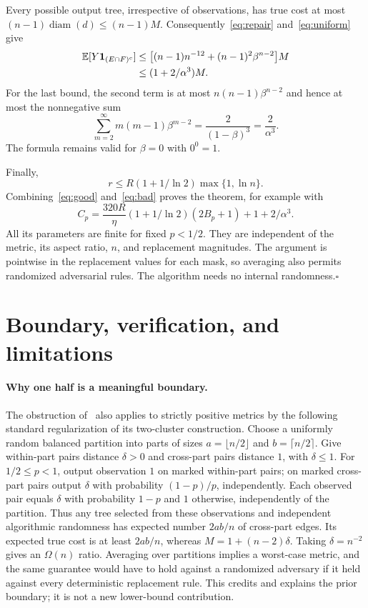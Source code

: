 \documentclass[acmlarge,screen,nonacm,11pt]{acmart}
\newcommand{\E}{\mathbb{E}}
\newcommand{\ind}{\mathbf{1}}
\begin{document}
Every possible output tree, irrespective of observations, has true cost at most $(n-1)\operatorname{diam}(d)\leq(n-1)M$. Consequently~\eqref{eq:repair} and~\eqref{eq:uniform} give
\begin{align}
 \E[Y\ind_{(E\cap F)^c}]
 &\leq\bigl[(n-1)n^{-12}+(n-1)^2\beta^{n-2}\bigr]M\notag\\
 &\leq(1+2/\alpha^3)M.\label{eq:bad}
\end{align}
For the last bound, the second term is at most $n(n-1)\beta^{n-2}$ and hence at most the nonnegative sum
\[
 \sum_{m=2}^{\infty}m(m-1)\beta^{m-2}
 =\frac{2}{(1-\beta)^3}=\frac{2}{\alpha^3}.
\]
The formula remains valid for $\beta=0$ with $0^0=1$.

Finally,
\[
 r\leq R(1+1/\ln2)\max\{1,\ln n\}.
\]
Combining~\eqref{eq:good} and~\eqref{eq:bad} proves the theorem, for example with
\[
 C_p=\frac{320R}{\eta}(1+1/\ln2)(2B_p+1)+1+2/\alpha^3.
\]
All its parameters are finite for fixed $p<1/2$. They are independent of the metric, its aspect ratio, $n$, and replacement magnitudes. The argument is pointwise in the replacement values for each mask, so averaging also permits randomized adversarial rules. The algorithm needs no internal randomness.\hfill$\square$

\section{Boundary, verification, and limitations}
\paragraph{Why one half is a meaningful boundary.}
The obstruction of~\cite[Theorem~1.5]{AGJLV26} also applies to strictly positive metrics by the following standard regularization of its two-cluster construction. Choose a uniformly random balanced partition into parts of sizes $a=\lfloor n/2\rfloor$ and $b=\lceil n/2\rceil$. Give within-part pairs distance $\delta>0$ and cross-part pairs distance $1$, with $\delta\leq1$. For $1/2\leq p<1$, output observation $1$ on marked within-part pairs; on marked cross-part pairs output $\delta$ with probability $(1-p)/p$, independently. Each observed pair equals $\delta$ with probability $1-p$ and $1$ otherwise, independently of the partition. Thus any tree selected from these observations and independent algorithmic randomness has expected number $2ab/n$ of cross-part edges. Its expected true cost is at least $2ab/n$, whereas $M=1+(n-2)\delta$. Taking $\delta=n^{-2}$ gives an $\Omega(n)$ ratio. Averaging over partitions implies a worst-case metric, and the same guarantee would have to hold against a randomized adversary if it held against every deterministic replacement rule. This credits and explains the prior boundary; it is not a new lower-bound contribution.
\end{document}
